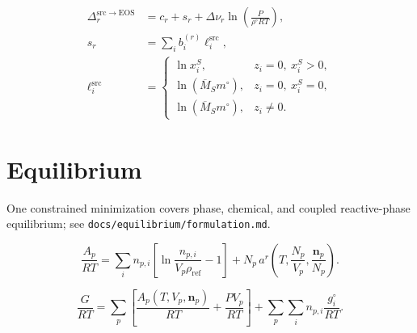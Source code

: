 \documentclass[11pt]{article}
\begin{document}
\begin{equation}
\begin{aligned}
\Delta_r^{\mathrm{src}\rightarrow\mathrm{EOS}}
&=c_r+s_r+\Delta\nu_r\ln\!\left(\frac{P}{\rho^\circ RT}\right),\\
s_r&=\sum_i b_i^{(r)}\ell_i^{\mathrm{src}},\\
\ell_i^{\mathrm{src}}&=
\begin{cases}
\ln x_i^S, & z_i=0,\ x_i^S>0,\\
\ln(\overline M_S m^\circ), & z_i=0,\ x_i^S=0,\\
\ln(\overline M_S m^\circ), & z_i\ne0.
\end{cases}
\end{aligned}
\label{eq:declared_solvent_source_reference_transfer}
\end{equation}

\nocite{*}
\section{Equilibrium}

One constrained minimization covers phase, chemical, and coupled reactive-phase equilibrium; see \texttt{docs/equilibrium/formulation.md}.

\begin{equation}
\frac{A_p}{RT}=\sum_i n_{p,i}\left[\ln\frac{n_{p,i}}{V_p\rho_{\mathrm{ref}}}-1\right]+N_p\,a^{r}\!\left(T,\frac{N_p}{V_p},\frac{\boldsymbol n_p}{N_p}\right).
\label{eq:phase_helmholtz_amount_volume}
\end{equation}

\begin{equation}
\frac{G}{RT}=\sum_p\left[\frac{A_p(T,V_p,\boldsymbol n_p)}{RT}+\frac{PV_p}{RT}\right]+\sum_p\sum_i n_{p,i}\frac{g^{\circ}_i}{RT}.
\label{eq:system_gibbs_helmholtz_coordinates}
\end{equation}
\end{document}
